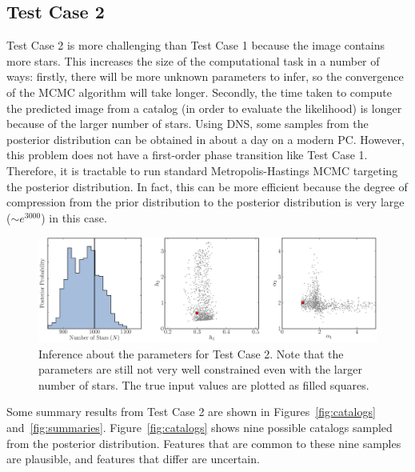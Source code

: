 \documentclass[12pt, preprint]{aastex}
\begin{document}
\subsection{Test Case 2}
Test Case 2 is more challenging than Test Case 1 because the image contains
more stars. This increases the size of the computational task in a number of
ways: firstly, there will be more unknown parameters to infer, so the
convergence of the MCMC algorithm will take longer. Secondly, the time taken
to compute the predicted image from a catalog (in order to evaluate the
likelihood) is longer because of the larger number of stars. Using DNS, some
samples from the posterior distribution can be obtained in about a day on a
modern PC. However, this problem does not have a first-order phase transition
like Test Case 1. Therefore, it is tractable to run standard Metropolis-Hastings
MCMC targeting the posterior distribution. In fact, this can be more efficient
because the degree of compression from the prior distribution to the posterior
distribution is very large ($\sim e^{3000}$) in this case.

\begin{figure}[ht!]
\begin{center}
\includegraphics[width=\textwidth]{Figures/inference2.eps}
\end{center}
\caption{Inference about the parameters for Test Case 2. Note that the
parameters are still not very well constrained even with the larger number of
stars. The true input values are plotted as filled squares.\label{fig:results2}}
\end{figure}

Some summary results from Test Case 2 are shown in Figures~\ref{fig:catalogs}
and~\ref{fig:summaries}. Figure~\ref{fig:catalogs} shows nine possible catalogs
sampled from the posterior
distribution. Features that are common to these nine samples are plausible, and
features that differ are uncertain.
\end{document}
